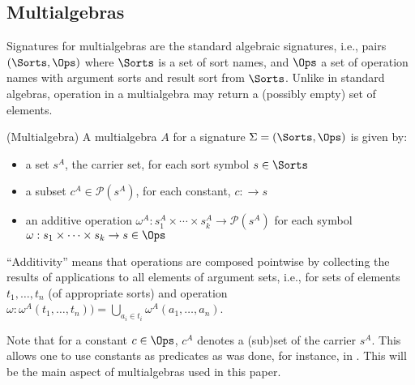 \subsection{Multialgebras}\label{sub:ma}
Signatures for multialgebras are the standard algebraic signatures, i.e.,
pairs $(\Sorts,\Ops)$ where $\Sorts$ is a set of sort names, and $\Ops$ a
set of operation names with argument sorts and result sort from
$\Sorts$. Unlike in standard algebras, operation in a multialgebra may return
a (possibly empty) set of elements.
%
\begin{definition}\label{def:ma}
(Multialgebra) A multialgebra $A$ for a signature $\Sigma=(\Sorts,\Ops)$ is given by:
\begin{itemize}\MyLPar
\item  a set $s^A$, the carrier set, for each sort symbol $s\in\Sorts$
\item  a subset $ c^A \in {\mathcal{P}}(s^A)$, for each constant, $c:\to s$
\item an additive operation $\omega^A : s_1^A \times \cdots \times s_k^A \to {\mathcal{P}}(s^A)$
	for each symbol $\omega : s_1\times\cdots\times s_k \to s \in \Ops$
\end{itemize}
\end{definition}
``Additivity'' means that operations are composed pointwise by collecting the
results of applications to all elements of argument sets, i.e., for sets of elements
$t_1,\ldots,t_n$ (of appropriate sorts) and operation $\omega:
\omega^A(t_1 , \ldots ,t_n)) = \bigcup_{a_{i}\in t_{i}}\omega^A(a_1 , \ldots
,a_n)$. 

Note that for a constant $c \in \Ops$, $c^A$ denotes a (sub)set of the
carrier $s^A$. This allows one to use constants as predicates as was done,
for instance, in \cite{partial}. This will be the main aspect of
multialgebras used in this paper.

